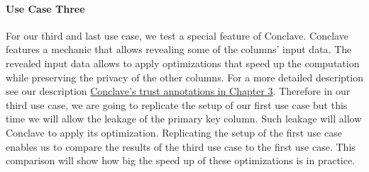\paragraph{Use Case Three}
For our third and last use case, we test a special feature of Conclave. Conclave features a mechanic that allows revealing some of the columns' input data. The revealed input data allows to apply optimizations that speed up the computation while preserving the privacy of the other columns. For a more detailed description see our description \hyperref[Trust_label]{Conclave's trust annotations in Chapter 3}. Therefore in our third use case, we are going to replicate the setup of our first use case but this time we will allow the leakage of the primary key column. Such leakage will allow Conclave to apply its optimization. Replicating the setup of the first use case enables us to compare the results of the third use case to the first use case. This comparison will show how big the speed up of these optimizations is in practice. 
















